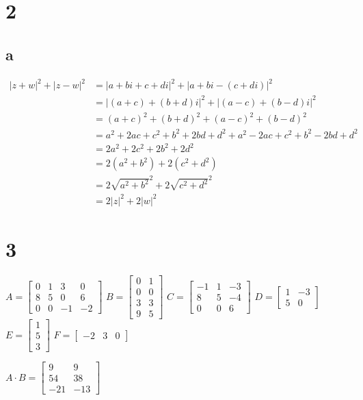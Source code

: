 \documentclass{article}
\begin{document}
\newpage
\section*{2}
\subsection*{a}
\begin{align*}
    |z+w|^2+|z-w|^2&=|a+bi+c+di|^2+|a+bi-(c+di)|^2\\
    &=|(a+c)+(b+d)i|^2+|(a-c)+(b-d)i|^2\\
    &=(a+c)^2+(b+d)^2+(a-c)^2+(b-d)^2\\
    &=a^2+2ac+c^2+b^2+2bd+d^2+a^2-2ac+c^2+b^2-2bd+d^2\\
    &=2a^2+2c^2+2b^2+2d^2\\
    &=2(a^2+b^2)+2(c^2+d^2)\\
    &=2\sqrt{a^2+b^2}^2+2\sqrt{c^2+d^2}^2\\
    &=2|z|^2+2|w|^2
\end{align*}
\section*{3}
$A=\begin{bmatrix}
    0&1&3&0\\
    8&5&0&6\\
    0&0&-1&-2
\end{bmatrix}$
$B=\begin{bmatrix}
    0&1\\
    0&0\\
    3&3\\
    9&5
\end{bmatrix}$
$C=\begin{bmatrix}
    -1&1&-3\\
    8&5&-4\\
    0&0&6
\end{bmatrix}$
$D=\begin{bmatrix}
    1&-3\\
    5&0
\end{bmatrix}$\\
$E=\begin{bmatrix}
    1\\5\\3
\end{bmatrix}$
$F=\begin{bmatrix}
    -2&3&0
\end{bmatrix}$


$A\cdot B=\begin{bmatrix}
    9&9\\
    54&38\\
    -21&-13
\end{bmatrix}$
\end{document}

